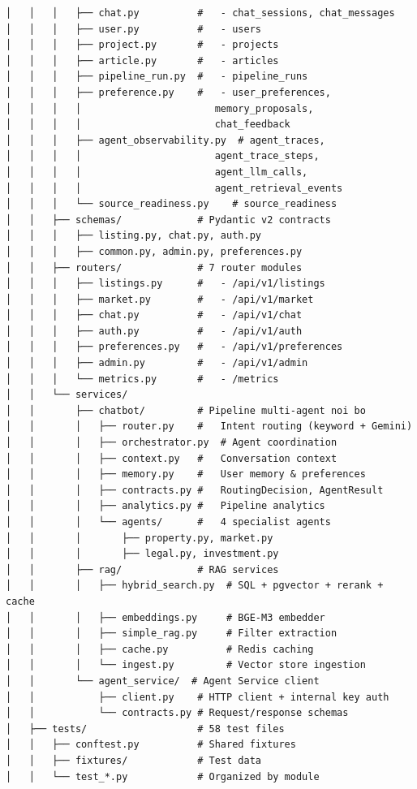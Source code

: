 \begin{lstlisting}[basicstyle=\ttfamily\footnotesize]
│   │   │   ├── chat.py          #   - chat_sessions, chat_messages
│   │   │   ├── user.py          #   - users
│   │   │   ├── project.py       #   - projects
│   │   │   ├── article.py       #   - articles
│   │   │   ├── pipeline_run.py  #   - pipeline_runs
│   │   │   ├── preference.py    #   - user_preferences,
│   │   │   │                       memory_proposals,
│   │   │   │                       chat_feedback
│   │   │   ├── agent_observability.py  # agent_traces,
│   │   │   │                       agent_trace_steps,
│   │   │   │                       agent_llm_calls,
│   │   │   │                       agent_retrieval_events
│   │   │   └── source_readiness.py    # source_readiness
│   │   ├── schemas/             # Pydantic v2 contracts
│   │   │   ├── listing.py, chat.py, auth.py
│   │   │   ├── common.py, admin.py, preferences.py
│   │   ├── routers/             # 7 router modules
│   │   │   ├── listings.py      #   - /api/v1/listings
│   │   │   ├── market.py        #   - /api/v1/market
│   │   │   ├── chat.py          #   - /api/v1/chat
│   │   │   ├── auth.py          #   - /api/v1/auth
│   │   │   ├── preferences.py   #   - /api/v1/preferences
│   │   │   ├── admin.py         #   - /api/v1/admin
│   │   │   └── metrics.py       #   - /metrics
│   │   └── services/
│   │       ├── chatbot/         # Pipeline multi-agent noi bo
│   │       │   ├── router.py    #   Intent routing (keyword + Gemini)
│   │       │   ├── orchestrator.py  # Agent coordination
│   │       │   ├── context.py   #   Conversation context
│   │       │   ├── memory.py    #   User memory & preferences
│   │       │   ├── contracts.py #   RoutingDecision, AgentResult
│   │       │   ├── analytics.py #   Pipeline analytics
│   │       │   └── agents/      #   4 specialist agents
│   │       │       ├── property.py, market.py
│   │       │       ├── legal.py, investment.py
│   │       ├── rag/             # RAG services
│   │       │   ├── hybrid_search.py  # SQL + pgvector + rerank + cache
│   │       │   ├── embeddings.py     # BGE-M3 embedder
│   │       │   ├── simple_rag.py     # Filter extraction
│   │       │   ├── cache.py          # Redis caching
│   │       │   └── ingest.py         # Vector store ingestion
│   │       └── agent_service/  # Agent Service client
│   │           ├── client.py    # HTTP client + internal key auth
│   │           └── contracts.py # Request/response schemas
│   ├── tests/                   # 58 test files
│   │   ├── conftest.py          # Shared fixtures
│   │   ├── fixtures/            # Test data
│   │   └── test_*.py            # Organized by module

\end{lstlisting}
